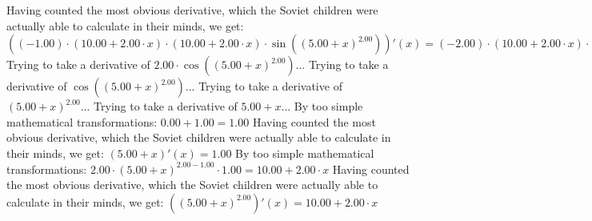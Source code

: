 \documentclass{article}
\begin{document}
 \newline
 \newline 
Having counted the most obvious derivative, which the Soviet children were actually able to calculate in their minds, we get:
$({\left({-1.00}\right) \cdot {\left({{10.00} + {{2.00} \cdot {x}}}\right) \cdot {\left({{10.00} + {{2.00} \cdot {x}}}\right) \cdot  \sin {\left({\left({{5.00} + {x}}\right) ^ {2.00}}\right)} }}})'(x) = {{\left({-2.00}\right) \cdot {\left({{10.00} + {{2.00} \cdot {x}}}\right) \cdot  \sin {\left({\left({{5.00} + {x}}\right) ^ {2.00}}\right)} }} - {\left({{10.00} + {{2.00} \cdot {x}}}\right) \cdot \left({{{2.00} \cdot  \sin {\left({\left({{5.00} + {x}}\right) ^ {2.00}}\right)} } + {\left({{10.00} + {{2.00} \cdot {x}}}\right) \cdot { \cos {\left({\left({{5.00} + {x}}\right) ^ {2.00}}\right)}  \cdot \left({{10.00} + {{2.00} \cdot {x}}}\right)}}}\right)}}$\newline
\newline
Trying to take a derivative of ${{2.00} \cdot  \cos {\left({\left({{5.00} + {x}}\right) ^ {2.00}}\right)} }$...\newline
\newline
Trying to take a derivative of $ \cos {\left({\left({{5.00} + {x}}\right) ^ {2.00}}\right)} $...\newline
\newline
Trying to take a derivative of ${\left({{5.00} + {x}}\right) ^ {2.00}}$...\newline
\newline
Trying to take a derivative of ${{5.00} + {x}}$...\newline
\newline
By too simple mathematical transformations:
 ${{0.00} + {1.00}} = {1.00}$ 
 \newline
 \newline 
Having counted the most obvious derivative, which the Soviet children were actually able to calculate in their minds, we get:
$({{5.00} + {x}})'(x) = {1.00}$\newline
\newline
By too simple mathematical transformations:
 ${{{2.00} \cdot {\left({{5.00} + {x}}\right) ^ {{2.00} - {1.00}}}} \cdot {1.00}} = {{10.00} + {{2.00} \cdot {x}}}$ 
 \newline
 \newline 
Having counted the most obvious derivative, which the Soviet children were actually able to calculate in their minds, we get:
$({\left({{5.00} + {x}}\right) ^ {2.00}})'(x) = {{10.00} + {{2.00} \cdot {x}}}$\newline
\end{document}
